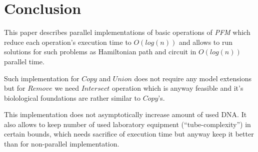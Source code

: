 \section{Conclusion}\label{conclusion}
This paper describes parallel implementations of basic operations of \emph{PFM} which reduce each operation's execution time to $O(log(n))$ and allows to run solutions for such problems as Hamiltonian path and circuit in $O(log(n))$ parallel time.

Such implementation for $Copy$ and $Union$ does not require any model extensions but for $Remove$ we need $Intersect$ operation which is anyway feasible and it's biolological foundations are rather similar to $Copy$'s.

This implementation does not asymptotically increase amount of used DNA. It also allows to keep number of used laboratory equipment (``tube-complexity'') in certain bounds, which needs sacrifice of execution time but anyway keep it better than for non-parallel implementation.